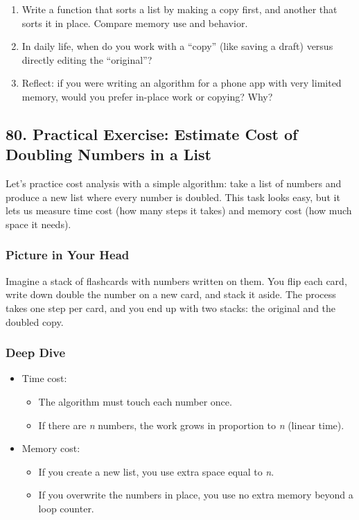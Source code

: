 \documentclass[
  letterpaper,
  DIV=11,
  numbers=noendperiod]{scrreprt}
\providecommand{\tightlist}{%
  \setlength{\itemsep}{0pt}\setlength{\parskip}{0pt}}
\begin{document}
\begin{enumerate}
\def\labelenumi{\arabic{enumi}.}
\tightlist
\item
  Write a function that sorts a list by making a copy first, and another
  that sorts it in place. Compare memory use and behavior.
\item
  In daily life, when do you work with a ``copy'' (like saving a draft)
  versus directly editing the ``original''?
\item
  Reflect: if you were writing an algorithm for a phone app with very
  limited memory, would you prefer in-place work or copying? Why?
\end{enumerate}

\subsection{80. Practical Exercise: Estimate Cost of Doubling Numbers in
a
List}\label{practical-exercise-estimate-cost-of-doubling-numbers-in-a-list}

Let's practice cost analysis with a simple algorithm: take a list of
numbers and produce a new list where every number is doubled. This task
looks easy, but it lets us measure time cost (how many steps it takes)
and memory cost (how much space it needs).

\subsubsection{Picture in Your Head}\label{picture-in-your-head-80}

Imagine a stack of flashcards with numbers written on them. You flip
each card, write down double the number on a new card, and stack it
aside. The process takes one step per card, and you end up with two
stacks: the original and the doubled copy.

\subsubsection{Deep Dive}\label{deep-dive-50}

\begin{itemize}
\item
  Time cost:

  \begin{itemize}
  \tightlist
  \item
    The algorithm must touch each number once.
  \item
    If there are \emph{n} numbers, the work grows in proportion to
    \emph{n} (linear time).
  \end{itemize}
\item
  Memory cost:

  \begin{itemize}
  \tightlist
  \item
    If you create a new list, you use extra space equal to \emph{n}.
  \item
    If you overwrite the numbers in place, you use no extra memory
    beyond a loop counter.
  \end{itemize}
\end{itemize}
\end{document}
